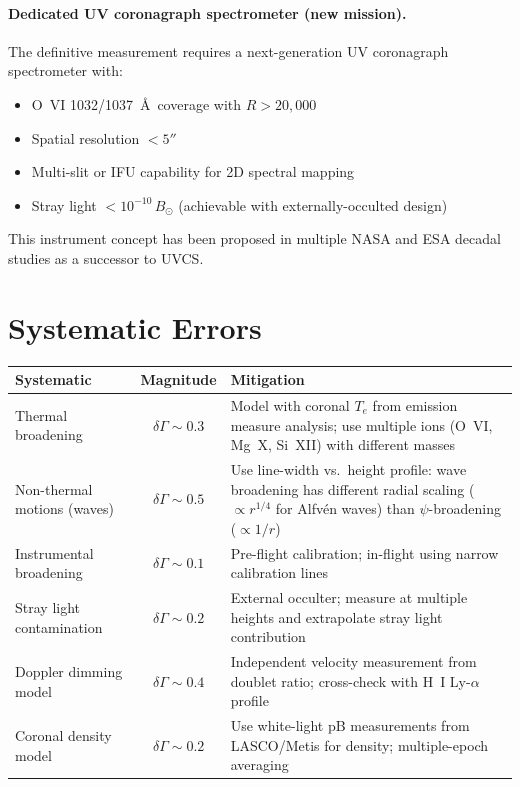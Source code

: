 \documentclass[11pt]{article}
\begin{document}
\paragraph{Dedicated UV coronagraph spectrometer (new mission).}
The definitive measurement requires a next-generation UV coronagraph
spectrometer with:
\begin{itemize}[nosep]
\item O~VI 1032/1037~\AA\ coverage with $R > 20{,}000$
\item Spatial resolution $< 5''$
\item Multi-slit or IFU capability for 2D spectral mapping
\item Stray light $< 10^{-10}\,B_\odot$ (achievable with
  externally-occulted design)
\end{itemize}

This instrument concept has been proposed in multiple NASA and ESA
decadal studies as a successor to UVCS.

\section{Systematic Errors}
\label{sec:corona-systematics}

\begin{center}
\begin{tabular}{lcp{6cm}}
\toprule
\textbf{Systematic} & \textbf{Magnitude} & \textbf{Mitigation} \\
\midrule
Thermal broadening & $\delta\Gamma \sim 0.3$ &
  Model with coronal $T_e$ from emission measure analysis;
  use multiple ions (O~VI, Mg~X, Si~XII) with different masses \\
\addlinespace
Non-thermal motions (waves) & $\delta\Gamma \sim 0.5$ &
  Use line-width vs.\ height profile: wave broadening has different
  radial scaling ($\propto r^{1/4}$ for Alfv\'{e}n waves) than
  $\psi$-broadening ($\propto 1/r$) \\
\addlinespace
Instrumental broadening & $\delta\Gamma \sim 0.1$ &
  Pre-flight calibration; in-flight using narrow calibration lines \\
\addlinespace
Stray light contamination & $\delta\Gamma \sim 0.2$ &
  External occulter; measure at multiple heights and extrapolate
  stray light contribution \\
\addlinespace
Doppler dimming model & $\delta\Gamma \sim 0.4$ &
  Independent velocity measurement from doublet ratio; cross-check
  with H~I Ly-$\alpha$ profile \\
\addlinespace
Coronal density model & $\delta\Gamma \sim 0.2$ &
  Use white-light pB measurements from LASCO/Metis for density;
  multiple-epoch averaging \\
\bottomrule
\end{tabular}
\end{center}
\end{document}
